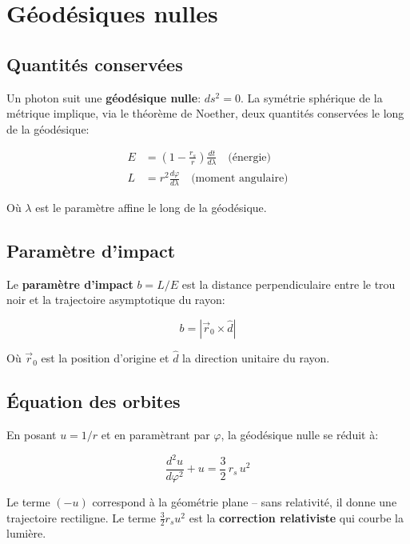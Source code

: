 \documentclass[12pt, a4paper]{article}
\begin{document}
\section{Géodésiques nulles}

\subsection{Quantités conservées}

Un photon suit une \textbf{géodésique nulle}: $ds^2 = 0$.
La symétrie sphérique de la métrique implique, via le théorème de Noether,
deux quantités conservées le long de la géodésique:

\begin{align}
    E &= \left(1 - \frac{r_s}{r}\right)\frac{dt}{d\lambda}
    \quad \text{(énergie)} \\
    L &= r^2\frac{d\varphi}{d\lambda}
    \quad \text{(moment angulaire)}
\end{align}

Où $\lambda$ est le paramètre affine le long de la géodésique.

\subsection{Paramètre d'impact}

Le \textbf{paramètre d'impact} $b = L/E$ est la distance perpendiculaire
entre le trou noir et la trajectoire asymptotique du rayon:

\begin{equation}
    b = |\vec{r}_0 \times \hat{d}|
\end{equation}

Où $\vec{r}_0$ est la position d'origine et $\hat{d}$ la direction unitaire du rayon.

\subsection{Équation des orbites}

En posant $u = 1/r$ et en paramètrant par $\varphi$, la géodésique nulle
se réduit à:

\begin{equation}
    \boxed{\frac{d^2u}{d\varphi^2} + u = \frac{3}{2}\,r_s\,u^2}
    \label{eq:geodesique}
\end{equation}

Le terme $(-u)$ correspond à la géométrie plane \--- sans relativité, il donne
une trajectoire rectiligne. Le terme $\frac{3}{2}r_s u^2$ est la
\textbf{correction relativiste} qui courbe la lumière.
\end{document}
